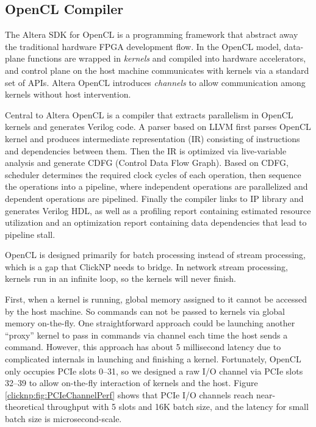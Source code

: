 {\subsection{OpenCL Compiler}

The Altera SDK for OpenCL \cite{singh2011implementing} is a programming framework that abstract away the traditional hardware FPGA development flow. In the OpenCL \cite{khronos2008opencl} model, data-plane functions are wrapped in \textit{kernels} and compiled into hardware accelerators, and control plane on the host machine communicates with kernels via a standard set of APIs. Altera OpenCL introduces \textit{channels} to allow communication among kernels without host intervention.

Central to Altera OpenCL is a compiler \cite{czajkowski2012opencl} that extracts parallelism in OpenCL kernels and generates Verilog code. A parser based on LLVM first parses OpenCL kernel and produces intermediate representation (IR) consisting of instructions and dependencies between them. Then the IR is optimized via live-variable analysis and generate CDFG (Control Data Flow Graph). Based on CDFG, scheduler determines the required clock cycles of each operation, then sequence the operations into a pipeline, where independent operations are parallelized and dependent operations are pipelined. Finally the compiler links to IP library and generates Verilog HDL, as well as a profiling report containing estimated resource utilization and an optimization report containing data dependencies that lead to pipeline stall.

OpenCL is designed primarily for batch processing instead of stream processing, which is a gap that ClickNP needs to bridge. In network stream processing, kernels run in an infinite loop, so the kernels will never finish.

First, when a kernel is running, global memory assigned to it cannot be accessed by the host machine. So commands can not be passed to kernels via global memory on-the-fly. One straightforward approach could be launching another ``proxy'' kernel to pass in commands via channel each time the host sends a command. However, this approach has about 5 millisecond latency due to complicated internals in launching and finishing a kernel. Fortunately, OpenCL only occupies PCIe slots 0--31, so we designed a raw I/O channel via PCIe slots 32--39 to allow on-the-fly interaction of kernels and the host. Figure \ref{clicknp:fig:PCIeChannelPerf} shows that PCIe I/O channels reach near-theoretical throughput with 5 slots and 16K batch size, and the latency for small batch size is microsecond-scale.

}
